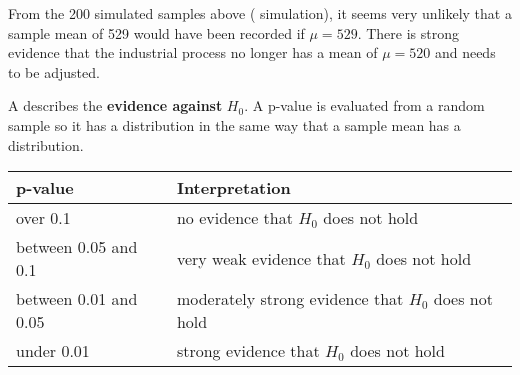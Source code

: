 

From the 200 simulated samples above ( simulation), it seems very unlikely that a sample mean of 529 would have been recorded if $\mu = 529$. There is strong evidence that the industrial process no longer has a mean of $\mu = 520$ and needs to be adjusted.

\begin{definition}[p-value]
    A  describes the \textbf{evidence against} $H_0$. A p-value is evaluated from a random sample so it has a distribution in the same way that a sample mean has a distribution.
\end{definition}

\begin{center}
    \begin{tabular}{p{4cm}|p{7cm}}
        \textbf{p-value} & \textbf{Interpretation} \\
        \hline
        over 0.1 & no evidence that $H_0$ does not hold \\
        between 0.05 and 0.1 & very weak evidence that $H_0$ does not hold \\
        between 0.01 and 0.05 & moderately strong evidence that $H_0$ does not hold \\
        under 0.01 & strong evidence that $H_0$ does not hold
    \end{tabular}
\end{center}


